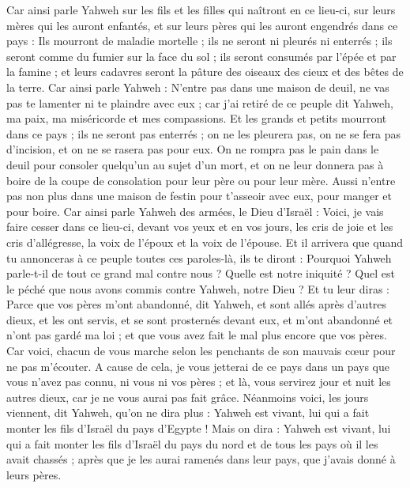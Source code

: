 \begin{multicols}{2}
Car ainsi parle Yahweh sur les fils et les filles qui naîtront en ce lieu-ci, sur leurs mères qui les auront enfantés, et sur leurs pères qui les auront engendrés dans ce pays :
Ils mourront de maladie mortelle ; ils ne seront ni pleurés ni enterrés ; ils seront comme du fumier sur la face du sol ; ils seront consumés par l'épée et par la famine ; et leurs cadavres seront la pâture des oiseaux des cieux et des bêtes de la terre.
Car ainsi parle Yahweh : N'entre pas dans une maison de deuil, ne vas pas te lamenter ni te plaindre avec eux ; car j'ai retiré de ce peuple dit Yahweh, ma paix, ma miséricorde et mes compassions.
Et les grands et petits mourront dans ce pays ; ils ne seront pas enterrés ; on ne les pleurera pas, on ne se fera pas d'incision, et on ne se rasera pas pour eux.
On ne rompra pas le pain dans le deuil pour consoler quelqu'un au sujet d'un mort, et on ne leur donnera pas à boire de la coupe de consolation pour leur père ou pour leur mère.
Aussi n'entre pas non plus dans une maison de festin pour t'asseoir avec eux, pour manger et pour boire.
Car ainsi parle Yahweh des armées, le Dieu d'Israël : Voici, je vais faire cesser dans ce lieu-ci, devant vos yeux et en vos jours, les cris de joie et les cris d'allégresse, la voix de l'époux et la voix de l'épouse.
Et il arrivera que quand tu annonceras à ce peuple toutes ces paroles-là, ils te diront : Pourquoi Yahweh parle-t-il de tout ce grand mal contre nous ? Quelle est notre iniquité ? Quel est le péché que nous avons commis contre Yahweh, notre Dieu ?
Et tu leur diras : Parce que vos pères m'ont abandonné, dit Yahweh, et sont allés après d'autres dieux, et les ont servis, et se sont prosternés devant eux, et m'ont abandonné et n'ont pas gardé ma loi ; 
et que vous avez fait le mal plus encore que vos pères. Car voici, chacun de vous marche selon les penchants de son mauvais cœur pour ne pas m'écouter.
A cause de cela, je vous jetterai de ce pays dans un pays que vous n'avez pas connu, ni vous ni vos pères ; et là, vous servirez jour et nuit les autres dieux, car je ne vous aurai pas fait grâce.
Néanmoins voici, les jours viennent, dit Yahweh, qu'on ne dira plus : Yahweh est vivant, lui qui a fait monter les fils d'Israël du pays d'Egypte !
Mais on dira : Yahweh est vivant, lui qui a fait monter les fils d'Israël du pays du nord et de tous les pays où il les avait chassés ; après que je les aurai ramenés dans leur pays, que j'avais donné à leurs pères.

\end{multicols}
